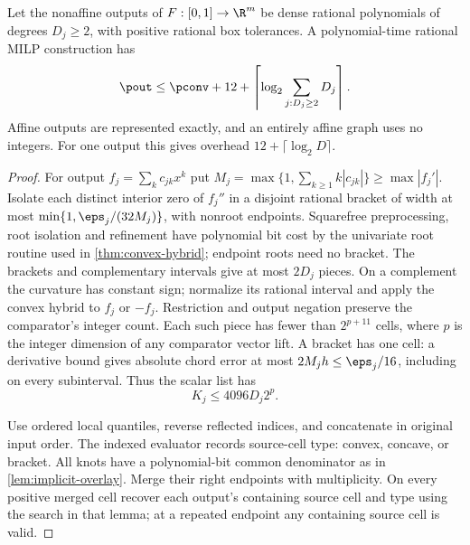 \begin{theorem}\label{thm:arbitrary-vector-overlay}
Let the nonaffine outputs of $F:[0,1]\to\R^m$ be dense rational
polynomials of degrees $D_j\ge2$, with positive rational box tolerances.
A polynomial-time rational MILP construction has
\begin{equation}\label{eq:arbitrary-vector-count}
 \pout\le\pconv+12+\left\lceil\log_2\sum_{j:D_j\ge2}D_j\right\rceil.
\end{equation}
Affine outputs are represented exactly, and an entirely affine graph
uses no integers. For one output this gives overhead
$12+\lceil\log_2D\rceil$.
\end{theorem}
\begin{proof}
For output $f_j=\sum_kc_{jk}x^k$ put
$M_j=\max\{1,\sum_{k\ge1}k|c_{jk}|\}\ge\max|f_j'|$.
Isolate each distinct interior zero of $f_j''$ in a disjoint rational
bracket of width at most $\min\{1,\eps_j/(32M_j)\}$, with nonroot
endpoints. Squarefree preprocessing, root isolation and refinement have
polynomial bit cost by the univariate root routine used in
\cref{thm:convex-hybrid}; endpoint roots need no bracket.
The brackets and complementary intervals give at most $2D_j$ pieces.
On a complement the curvature has constant sign; normalize its rational
interval and apply the convex hybrid to $f_j$ or $-f_j$.
Restriction and output negation preserve the comparator's integer count.
Each such piece has fewer than $2^{p+11}$ cells, where $p$ is the
integer dimension of any comparator vector lift. A bracket has one cell:
a derivative bound gives absolute chord error at most
$2M_jh\le\eps_j/16$, including on every subinterval.
Thus the scalar list has
\begin{equation}\label{eq:arbitrary-scalar-cells}
 K_j\le4096D_j2^p.
\end{equation}

Use ordered local quantiles, reverse reflected indices, and concatenate
in original input order. The indexed evaluator records source-cell type:
convex, concave, or bracket. All knots have a polynomial-bit common
denominator as in \cref{lem:implicit-overlay}. Merge their right
endpoints with multiplicity. On every positive merged cell recover each
output's containing source cell and type using the search in that lemma;
at a repeated endpoint any containing source cell is valid.


\end{proof}
